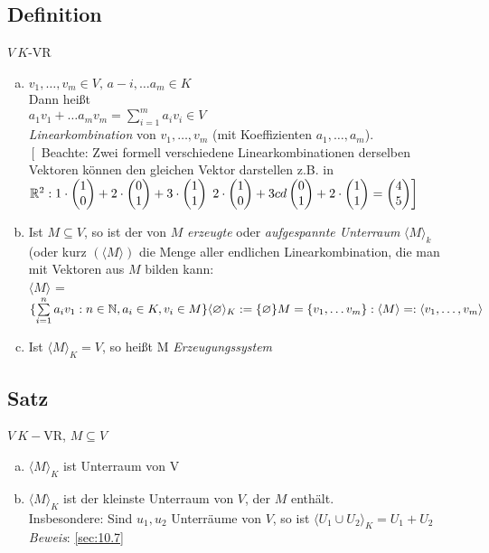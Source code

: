 \subsection{Definition}
$V\ K$-VR
\begin{enumerate}[a)]
\item $v_1,\ldots,v_m \in V,\,a-i,\ldots a_m \in K$\\
Dann hei\ss t\\
$a_1v_1+\ldots a_mv_m = \sum\limits^{m}_{i=1} a_i v_i \in V$\\
\emph{Linearkombination} von $v_1,\ldots,v_m$ (mit Koeffizienten $a_1,\ldots,a_m$).\\
$\left\lbrack\right. $ Beachte: Zwei formell verschiedene Linearkombinationen derselben Vektoren können den gleichen Vektor darstellen z.B. in $\mathbb{R}^2:\:\\
1\cdot \begin{pmatrix} 1\\0 \end{pmatrix} + 2 \cdot \begin{pmatrix} 0\\1 \end{pmatrix} + 3 \cdot \begin{pmatrix} 1\\1 \end{pmatrix}\\
\left.2 \cdot \begin{pmatrix} 1\\0 \end{pmatrix} + 3 cd \begin{pmatrix} 0\\1 \end{pmatrix} + 2 \cdot \begin{pmatrix} 1\\1 \end{pmatrix} = \begin{pmatrix} 4\\5 \end{pmatrix}\right\rbrack$
\item Ist $M \subseteq V$, so ist der von $M$ \emph{erzeugte} oder \emph{aufgespannte Unterraum} $\langle M \rangle _k$ (oder kurz $(\langle M \rangle )$ die Menge aller endlichen Linearkombination, die man mit Vektoren aus $M$ bilden kann:\\
$\langle M \rangle $ = $\{ \sum\limits_{i=1}^{n}a_iv_1 : n \in \mathbb{N},a_i \in K,v_i \in M \}\\
\langle \varnothing \rangle _K:= \{\varnothing\}\\
M = \{ v_1,\ldots v_m \} : \langle M \rangle  =: \langle v_1,\ldots,v_m \rangle $
\item Ist $\langle M \rangle _K = V$, so hei\ss t M \emph{Erzeugungssystem}
\end{enumerate}
\subsection{Satz}
$V\ K-$VR, $M \subseteq V$
\begin{enumerate}[a)]
\item $\langle M \rangle _K$ ist Unterraum von V
\item $\langle M \rangle _K$ ist der kleinste Unterraum von $V$, der $M$ enthält.\\
Insbesondere: Sind $u_1,u_2$ Unterräume von $V$, so ist $\langle U_1 \cup U_2 \rangle _K = U_1 + U_2$\\
\emph{Beweis}: \ref{sec:10.7}
\end{enumerate}
